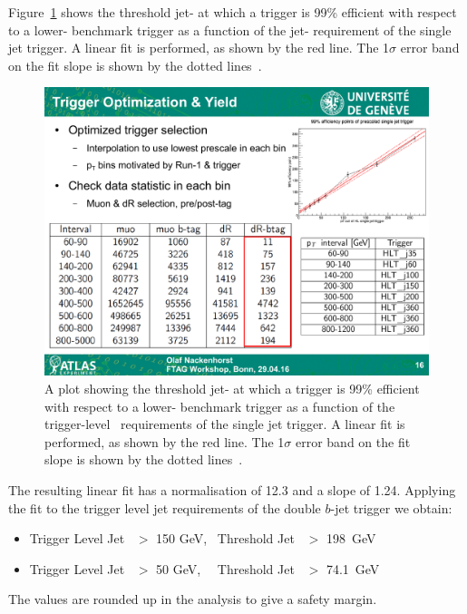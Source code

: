 Figure~\ref{fig:triggerTurnOn_fit} shows the threshold jet-\pT{} 
at which a trigger is 99\% efficient with respect to a lower-\pT{} benchmark trigger
as a function of the jet-\pT{} requirement of the single jet trigger.
A linear fit is performed, as shown by the red line.
The 1$\sigma$ error band on the fit slope is shown by the dotted lines~\cite{evt-jet_turnOnFit}.

\begin{figure}[!hbt]
    \begin{center}
        \includegraphics[width=0.7\linewidth, angle=0]{figs/Dibjet/LowMass/jetTriggerTurnOn.pdf}
      \end{center}
  \caption[A plot showing the threshold jet-\pT{} of a single jet trigger as a function of the trigger-level~\pT{} requirements.]
           {A plot showing the threshold jet-\pT{} at which a trigger is 99\% efficient
             with respect to a lower-\pT{} benchmark trigger as a function of the trigger-level~\pT{} requirements of the single jet trigger.
             A linear fit is performed, as shown by the red line. The 1$\sigma$ error band on the fit slope is shown by the dotted lines~\cite{evt-jet_turnOnFit}.}
          \label{fig:triggerTurnOn_fit}
\end{figure}

\noindent
The resulting linear fit has a normalisation of 12.3 and a slope of 1.24.
Applying the fit to the trigger level jet requirements of the double $b$-jet trigger we obtain:
\vspace{-0.5em}
\begin{itemize}[leftmargin=*]
\item Trigger Level Jet~\pT{} $>$ 150 GeV,~  Threshold Jet~\pT{} $>$ 198~GeV 
\item Trigger Level Jet~\pT{} $>$  50 GeV,~~ Threshold Jet~\pT{} $>$ 74.1~GeV
\end{itemize}
\vspace{-0.3em}
\noindent
The values are rounded up in the analysis to give a safety margin.

